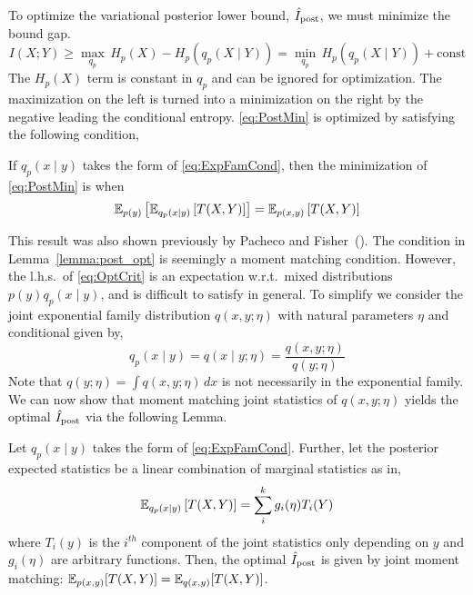To optimize the variational posterior lower bound, $\hat{I}_{\text{post}}$, we must minimize the
bound gap.
\begin{equation}\label{eq:PostMin}
  I(X;Y) \geq \max_{q_p} \, H_p(X) - H_p(q_p(X \mid Y)) = \min_{q_p} \, H_p(q_p(X \mid Y)) + \text{const}
\end{equation}
The $H_p(X)$ term is constant in $q_p$ and can be ignored for
optimization. The maximization on the left is turned into a
minimization on the right by the negative leading the conditional
entropy.  \EQN\eqref{eq:PostMin} is optimized by satisfying the following
condition,
\begin{lemma}\label{lemma:post_opt}
  If $q_p(x\mid y)$ takes the form of \EQN\ref{eq:ExpFamCond}, then the minimization
  of \EQN\eqref{eq:PostMin} is when
  \begin{equation}\label{eq:OptCrit}
    \mathbb{E}_{p(y)}\left[\mathbb{E}_{q_p(x\mid y)}\left[T(X,Y)\right]\right]=\mathbb{E}_{p(x,y)}\left[T(X,Y)\right]
  \end{equation}
\end{lemma}\vspace*{-2mm}
This result was also shown previously by Pacheco and
Fisher~(\citeyear{pacheco2019variational}).  The condition in
Lemma~\ref{lemma:post_opt} is seemingly a moment matching condition.
However, the l.h.s.~of \EQN\ref{eq:OptCrit} is an expectation
w.r.t.~mixed distributions $p(y)q_p(x\mid y)$, and is difficult to satisfy
in general.  To simplify we consider the joint exponential family
distribution $q(x,y;\eta)$ with natural parameters $\eta$ and
conditional given by,
\begin{equation}\label{eq:ExpFamCond}
  q_p(x\mid y)=q(x\mid y;\eta)=\dfrac{q(x,y;\eta)}{q(y;\eta)}
\end{equation}\label{lemma:OptCrit}
Note that $q(y;\eta)=\int q(x,y;\eta) \, dx$ is not necessarily in the
exponential family.  We can now show that moment matching joint
statistics of $q(x,y;\eta)$ yields the optimal $\hat{I}_{\text{post}}$ via the
following Lemma.
\begin{lemma}\label{lemma:MMOptCrit}
  Let $q_p(x\mid y)$ takes the form of \EQN\ref{eq:ExpFamCond}. Further,
  let the posterior expected statistics be a linear combination of
  marginal statistics as in,\vspace*{-3mm}
  \begin{equation}\label{eq:linearY}
    \mathbb{E}_{q_p(x\mid y)}\left[T(X,Y)\right]=\sum_i^k g_i(\eta)T_{i}(Y)
  \end{equation}
  where $T_i(y)$ is the $i^{th}$ component of the joint statistics
  only depending on  $y$ and $g_i(\eta)$ are arbitrary functions. 
  Then, the optimal $\hat{I}_{\text{post}}$ is given by joint moment matching:
  $\mathbb{E}_{p(x,y)}[ T(X,Y) ] = \mathbb{E}_{q(x,y)}[ T(X,Y) ]$. 
\end{lemma}
